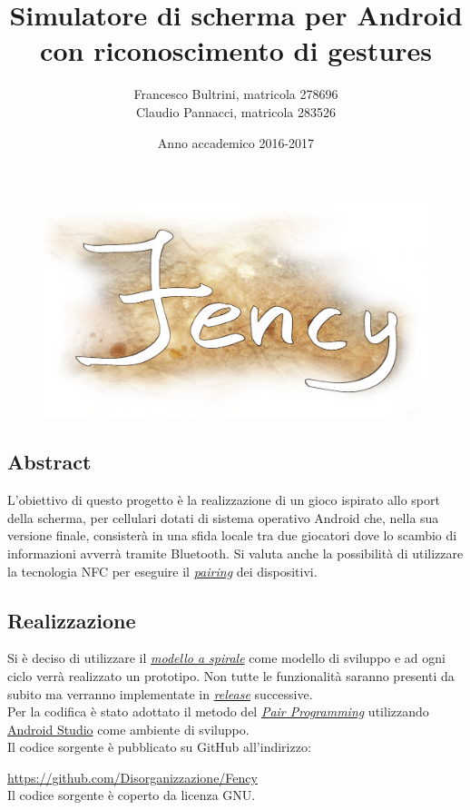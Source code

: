 \documentclass[a4paper,11pt]{article}
\title{Simulatore di scherma per Android\\con riconoscimento di gestures}
\author{Francesco Bultrini, matricola 278696\\
 Claudio Pannacci, matricola 283526}
\date{Anno accademico 2016-2017}
\begin{document}
\begin{figure}[t]

  \centering
  \includegraphics{img_fency_logo}

\end{figure}

\maketitle
\newpage

\tableofcontents
\newpage

\subsection{Abstract}
L'obiettivo di questo progetto è la realizzazione di un gioco  ispirato allo sport della scherma, per cellulari dotati di sistema operativo Android che, nella sua versione finale, consisterà in una sfida locale tra due giocatori dove lo scambio di informazioni avverrà tramite Bluetooth. Si valuta anche la possibilità di utilizzare la tecnologia NFC per eseguire il \hyperref[pairing]{\emph{pairing}} dei dispositivi.\\
\subsection{Realizzazione}
Si è deciso di utilizzare il \hyperref[spirale]{\emph{modello a spirale}} come modello di sviluppo e ad ogni ciclo verrà realizzato un prototipo. Non tutte le funzionalità saranno presenti da subito ma verranno implementate in \hyperref[release]{\emph{release}} successive. \\Per la codifica è stato adottato il metodo del \hyperref[pairp]{\emph{Pair Programming}} utilizzando \href{https://developer.android.com/studio/index.html}{Android Studio} come ambiente di sviluppo.\\Il codice sorgente è pubblicato su GitHub all'indirizzo: \begin{center}
\url{https://github.com/Disorganizzazione/Fency}\\
{\footnotesize Il codice sorgente è coperto da licenza GNU.}
\end{center}
\newpage
\end{document}
